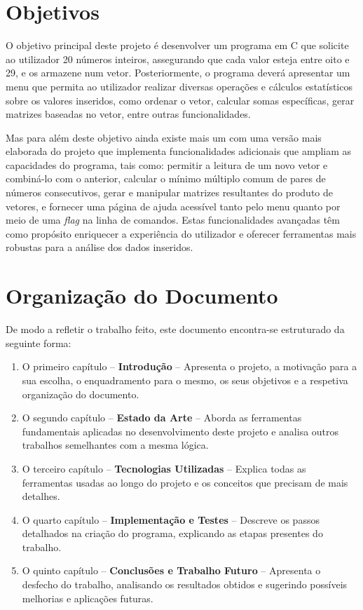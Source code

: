 \section{Objetivos}
\label{sec:obj}
O objetivo principal deste projeto é desenvolver um programa em C que solicite ao utilizador 20 números inteiros, assegurando que cada valor esteja entre oito e 29, e os armazene num vetor. Posteriormente, o programa deverá apresentar um menu que permita ao utilizador realizar diversas operações e cálculos estatísticos sobre os valores inseridos, como ordenar o vetor, calcular somas específicas, gerar matrizes baseadas no vetor, entre outras funcionalidades. \par
Mas para além deste objetivo ainda existe mais um com uma versão mais elaborada do projeto que implementa funcionalidades adicionais que ampliam as capacidades do programa, tais como: permitir a leitura de um novo vetor e combiná-lo com o anterior, calcular o mínimo múltiplo comum de pares de números consecutivos, gerar e manipular matrizes resultantes do produto de vetores, e fornecer uma página de ajuda acessível tanto pelo menu quanto por meio de uma \textit{flag} na linha de comandos. Estas funcionalidades avançadas têm como propósito enriquecer a experiência do utilizador e oferecer ferramentas mais robustas para a análise dos dados inseridos.


\section{Organização do Documento}
\label{sec:organ}
De modo a refletir o trabalho feito, este documento encontra-se estruturado da seguinte forma:
\begin{enumerate}
\item O primeiro capítulo -- \textbf{Introdução} -- Apresenta o projeto, a motivação para a sua escolha, o enquadramento para o mesmo, os seus objetivos e a respetiva organização do documento.
\item O segundo capítulo -- \textbf{Estado da Arte} -- Aborda as ferramentas fundamentais aplicadas no desenvolvimento deste projeto e analisa outros trabalhos semelhantes com a mesma lógica.
\item O terceiro capítulo -- \textbf{Tecnologias Utilizadas} -- Explica todas as ferramentas usadas ao longo do projeto e os conceitos que precisam de mais detalhes.
\item O quarto capítulo -- \textbf{Implementação e Testes} -- Descreve os passos detalhados na criação do programa, explicando as etapas presentes do trabalho.
\item O quinto capítulo -- \textbf{Conclusões e Trabalho Futuro} -- Apresenta o desfecho do trabalho, analisando os resultados obtidos e sugerindo possíveis melhorias e aplicações futuras.
\end{enumerate}